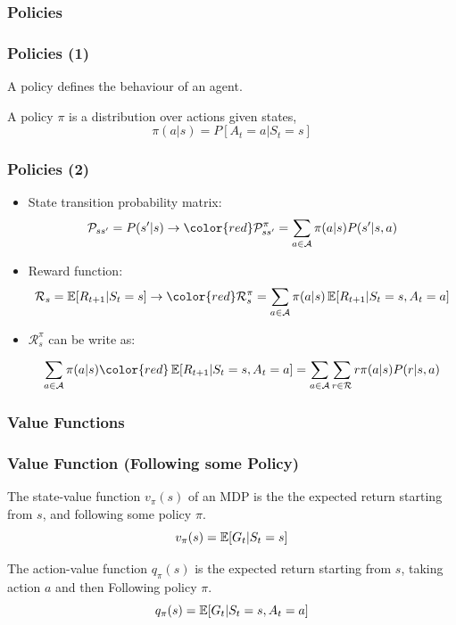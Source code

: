 \subsubsection{Policies}
\begin{frame}
    \frametitle{Policies (1)}

    \centering
    {\color{red}A policy defines the behaviour of an agent.}

    \begin{definition}
        A policy $\pi$ is a distribution over actions given states,
        $$\pi(a|s)=P[A_t=a|S_t=s]$$
    \end{definition}

\end{frame}

\begin{frame}
    \frametitle{Policies (2)}


    \begin{itemize}
        \item State transition probability matrix: 
        $$\mathcal{P}_{ss'} = P(s'|s) \rightarrow 
        {\color{red}\mathcal{P}_{ss'}^{\pi} = \sum_{a\in\mathcal{A}}\pi(a|s)P(s'|s,a)}$$
        \item Reward function: 
        $$\mathcal{R}_s = \E[R_{t+1}|S_t=s] \rightarrow 
        {\color{red}\mathcal{R}_{s}^{\pi} = \sum_{a\in\mathcal{A}}\pi(a|s)\E[R_{t+1}|S_t=s, A_t=a]}$$

        \item $\mathcal{R}_{s}^{\pi}$ can be write as:

        $$\sum_{a\in\mathcal{A}}\pi(a|s){\color{red}\E[R_{t+1}|S_t=s, A_t=a]} = 
        \sum_{a\in\mathcal{A}}\sum_{r\in\mathcal{R}}r\pi(a|s)P(r|s,a)$$
    \end{itemize}  

\end{frame}



\subsubsection{Value Functions}

\begin{frame}
    \frametitle{Value Function (Following some Policy)}
    \begin{definition}
        The state-value function $v_{\pi}(s)$ of an MDP is 
        the {\color{red} the expected return starting from $s$, and
        following some policy $\pi$}.
        $$v_{\pi}(s) = \operatorname*{\mathbb{E}}[G_t|S_t=s]$$
    \end{definition}


    \begin{definition}
        The action-value function $q_{\pi}(s)$ is the {\color{red} expected 
        return starting from $s$, taking action $a$ and then Following
        policy $\pi$}.
        $$q_{\pi}(s) = \operatorname*{\mathbb{E}}[G_t|S_t=s,A_t=a]$$
    \end{definition}

\end{frame}


